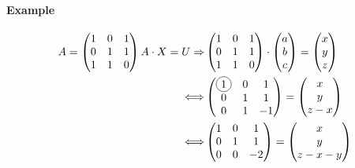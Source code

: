 \documentclass[notitlepage]{math}
\begin{document}
\paragraph{Example}
\begin{align*}
        A = \begin{pmatrix}
        1 & 0 & 1 \\
        0 & 1 & 1 \\
        1 & 1 & 0 
        \end{pmatrix} 
        A \cdot X = U \Rightarrow& 
        \begin{pmatrix}
            1 & 0 & 1 \\
            0 & 1 & 1 \\
            1 & 1 & 0
        \end{pmatrix} \cdot \begin{pmatrix}
            a \\
            b \\
            c
        \end{pmatrix} = \begin{pmatrix}
            x \\
            y \\
            z
        \end{pmatrix} \\
        \Longleftrightarrow & 
        \begin{pmatrix}
            \circled{1} & 0 & 1 \\
            0 & 1 & 1 \\
            0 & 1 & -1
        \end{pmatrix}
        =
        \begin{pmatrix}
            x \\
            y \\
            z - x
        \end{pmatrix} \\
        \Longleftrightarrow &
        \begin{pmatrix}
            1 & 0 & 1 \\
            0 & 1 & 1 \\
            0 & 0  & -2
        \end{pmatrix} = 
        \begin{pmatrix}
            x \\
            y \\
            z - x - y
        \end{pmatrix} \\

\end{align*}
\end{document}
